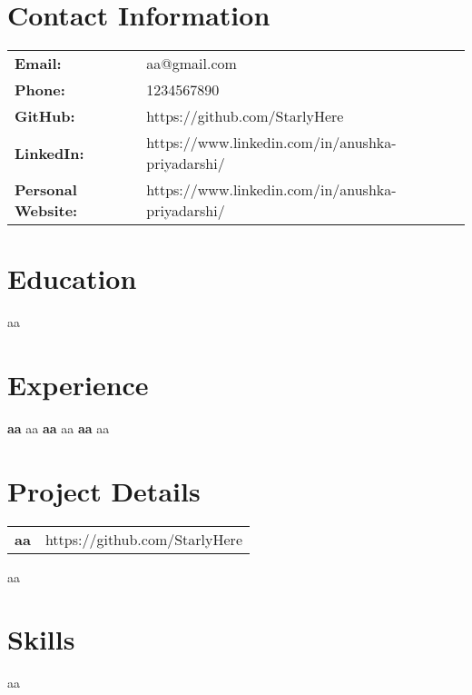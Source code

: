 \documentclass{article}
\begin{document}
\begin{center}
\end{center}

\section*{Contact Information}
\vspace*{-1em}
\noindent\hrulefill %
\newline
\begin{tabular}{@{}ll}
\textbf{Email:} & aa@gmail.com \\
\textbf{Phone:} & 1234567890 \\
\textbf{GitHub:} & https://github.com/StarlyHere \\
\textbf{LinkedIn:} & https://www.linkedin.com/in/anushka-priyadarshi/ \\
\textbf{Personal Website:} & https://www.linkedin.com/in/anushka-priyadarshi/ \\
\end{tabular}

\section*{Education}
\vspace*{-1em}
\noindent\hrulefill %
\newline
aa

\section*{Experience}
\vspace*{-1em}
\noindent\hrulefill %
\newline
\textbf{aa}
\newline
aa
\vspace{1em} %
\newline
\textbf{aa}
\newline
aa
\vspace{1em} %
\newline
\textbf{aa}
\newline
aa

\section*{Project Details}
\vspace*{-1em}
\noindent\hrulefill %
\newline
\begin{tabular}{@{}>{\raggedright\arraybackslash}p{} >{\raggedleft\arraybackslash}p{}@{}}
\textbf{aa} & {https://github.com/StarlyHere} \\
\end{tabular}
\newline
aa

\section*{Skills}
\vspace*{-1em}
\noindent\hrulefill %
\newline
aa
\end{document}
